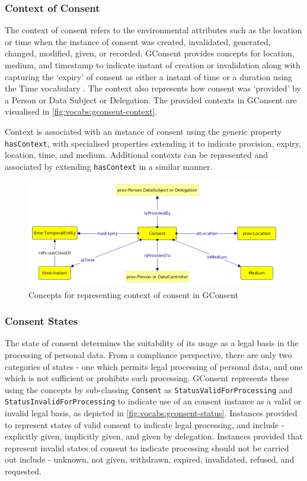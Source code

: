 \subsubsection{Context of Consent}
The context of consent refers to the environmental attributes such as the location or time when the instance of consent was created, invalidated, generated, changed, modified, given, or recorded.
GConsent provides concepts for location, medium, and timestamp to indicate instant of creation or invalidation along with capturing the `expiry' of consent as either a instant of time or a duration using the Time vocabulary \cite{}. The context also represents how consent was `provided' by a Person or Data Subject or Delegation. 
The provided contexts in GConsent are visualised in \autoref{fig:vocabs:gconsent-context}.

Context is associated with an instance of consent using the generic property \texttt{hasContext}, with specialised properties extending it to indicate provision, expiry, location, time, and medium. 
Additional contexts can be represented and associated by extending \texttt{hasContext} in a similar manner.
\begin{figure}[htbp]
    \centering
    \includegraphics[width=0.8\linewidth]{img/gconsent_context.png}
    \caption{Concepts for representing context of consent in GConsent \cite{}}
    \label{fig:vocabs:gconsent-context}
\end{figure}

\subsubsection{Consent States}
The state of consent determines the suitability of its usage as a legal basis in the processing of personal data.
From a compliance perspective, there are only two categories of states - one which permits legal processing of personal data, and one which is not sufficient or prohibits such processing.
GConsent represents these using the concepts by sub-classing \texttt{Consent} as \texttt{StatusValidForProcessing} and \texttt{StatusInvalidForProcessing} to indicate use of an consent instance as a valid or invalid legal basis, as depicted in \autoref{fig:vocabs:gconsent-status}.
Instances provided to represent states of valid consent to indicate legal processing, and include - explicitly given, implicitly given, and given by delegation.
Instances provided that represent invalid states of consent to indicate processing should not be carried out include - unknown, not given, withdrawn, expired, invalidated, refused, and requested.

